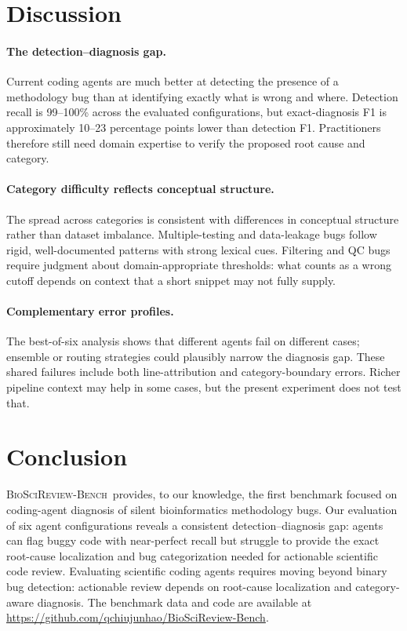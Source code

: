 \documentclass[11pt]{article}
\newcommand{\bench}{\textsc{BioSciReview-Bench}}
\begin{document}
\section{Discussion}

\paragraph{The detection--diagnosis gap.}
Current coding agents are much better at detecting the presence of a methodology bug than at identifying exactly what is wrong and where. Detection recall is 99--100\% across the evaluated configurations, but exact-diagnosis F1 is approximately 10--23 percentage points lower than detection F1. Practitioners therefore still need domain expertise to verify the proposed root cause and category.

\paragraph{Category difficulty reflects conceptual structure.}
The spread across categories is consistent with differences in conceptual structure rather than dataset imbalance. Multiple-testing and data-leakage bugs follow rigid, well-documented patterns with strong lexical cues. Filtering and QC bugs require judgment about domain-appropriate thresholds: what counts as a wrong cutoff depends on context that a short snippet may not fully supply.

\paragraph{Complementary error profiles.}
The best-of-six analysis shows that different agents fail on different cases; ensemble or routing strategies could plausibly narrow the diagnosis gap. These shared failures include both line-attribution and category-boundary errors. Richer pipeline context may help in some cases, but the present experiment does not test that.

\section{Conclusion}

\bench\ provides, to our knowledge, the first benchmark focused on coding-agent diagnosis of silent bioinformatics methodology bugs. Our evaluation of six agent configurations reveals a consistent detection--diagnosis gap: agents can flag buggy code with near-perfect recall but struggle to provide the exact root-cause localization and bug categorization needed for actionable scientific code review. Evaluating scientific coding agents requires moving beyond binary bug detection: actionable review depends on root-cause localization and category-aware diagnosis. The benchmark data and code are available at \url{https://github.com/qchiujunhao/BioSciReview-Bench}.
\end{document}
